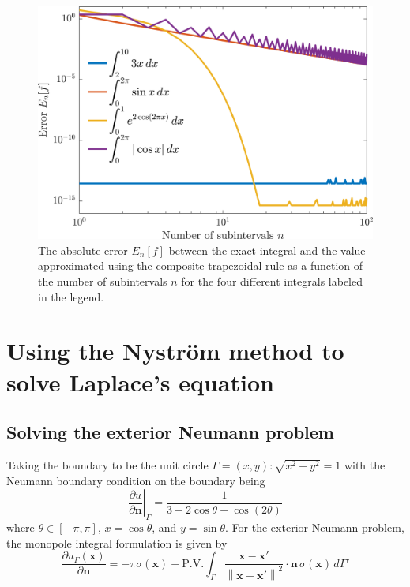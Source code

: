 \documentclass[11pt]{article}
\newcommand\p[2]{\frac{\partial #1}{\partial #2}}
\newcommand{\norm}[1]{\left\lVert#1\right\rVert}
\begin{document}
\begin{figure}[!htb]
  \centering
  \includegraphics[width=\linewidth]{trapezoid_error.png}
  \caption{The absolute error $E_n[f]$ between the exact integral and the value approximated using the composite trapezoidal rule as a function of the number of subintervals $n$ for the four different integrals labeled in the legend.}
  \label{fig:trapezoid_error}
\end{figure}

\section{Using the Nyström method to solve Laplace's equation}

\subsection{Solving the exterior Neumann problem}
Taking the boundary to be the unit circle $\Gamma = {(x,y) : \sqrt{x^2 + y^2} = 1}$ with the Neumann boundary condition on the boundary being
\begin{equation}
  \left. \p{u}{\bm{n}} \right\rvert_\Gamma =  \frac{1}{3 + 2\cos\theta + \cos(2\theta)}
\end{equation}
where $\theta \in [-\pi, \pi]$, $x = \cos\theta$, and $y = \sin\theta$. For the exterior Neumann problem, the monopole integral formulation is given by
\begin{equation}
  \p{u_\Gamma(\bm{x})}{\bm{n}}
  = -\pi\sigma(\bm{x}) - \mathrm{P.V.}\int_\Gamma \frac{\bm{x-x'}}{\norm{\bm{x-x'}}^2} \cdot \bm{n} \, \sigma(\bm{x}) \, d\Gamma'
\end{equation}
\end{document}
